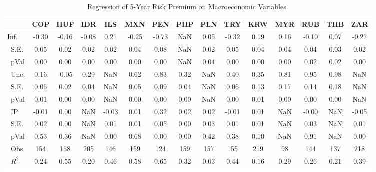 \begin{table}
	\centering
\begin{tabular}{l|cccccccccccccc}
\toprule
&\textbf{COP}&\textbf{HUF}&\textbf{IDR}&\textbf{ILS}&\textbf{MXN}&\textbf{PEN}&\textbf{PHP}&\textbf{PLN}&\textbf{TRY}&\textbf{KRW}&\textbf{MYR}&\textbf{RUB}&\textbf{THB}&\textbf{ZAR}\\\midrule
{ Inf.}&-0.30&-0.16&-0.08&0.21&-0.25&-0.73&NaN&0.05&-0.32&0.19&0.16&-0.10&0.07&-0.27\\\
{S.E.}&0.05&0.02&0.02&0.02&0.04&0.08&NaN&0.02&0.05&0.04&0.04&0.04&0.03&0.02\\\
{pVal}&0.00&0.00&0.00&0.00&0.00&0.00&NaN&0.04&0.00&0.00&0.00&0.02&0.02&0.00\\\
{Une.}&0.16&-0.05&0.29&NaN&0.62&0.83&0.32&NaN&0.40&0.35&0.81&0.95&0.98&NaN\\\
{S.E.}&0.06&0.02&0.04&NaN&0.05&0.09&0.04&NaN&0.06&0.13&0.17&0.14&0.18&NaN\\\
{pVal}&0.01&0.00&0.00&NaN&0.00&0.00&0.00&NaN&0.00&0.01&0.00&0.00&0.00&NaN\\\
{IP}&-0.01&0.00&NaN&-0.03&0.01&0.32&0.02&0.02&-0.01&0.01&NaN&-0.00&NaN&-0.05\\\
{S.E.}&0.02&0.00&NaN&0.01&0.01&0.05&0.00&0.03&0.01&0.01&NaN&0.03&NaN&0.01\\\
{pVal}&0.53&0.36&NaN&0.00&0.68&0.00&0.00&0.42&0.38&0.10&NaN&0.91&NaN&0.00\\\
{Obs}&154&138&205&146&159&124&159&157&155&219&98&144&137&218\\\
{$R^2$}&0.24&0.55&0.20&0.46&0.58&0.65&0.32&0.03&0.44&0.16&0.29&0.26&0.21&0.39\\ \bottomrule
\end{tabular}
\\
\caption{Regression of 5-Year Risk Premium on Macroeconomic Variables.}
\label{tab:rp_reg_macro}
\end{table}